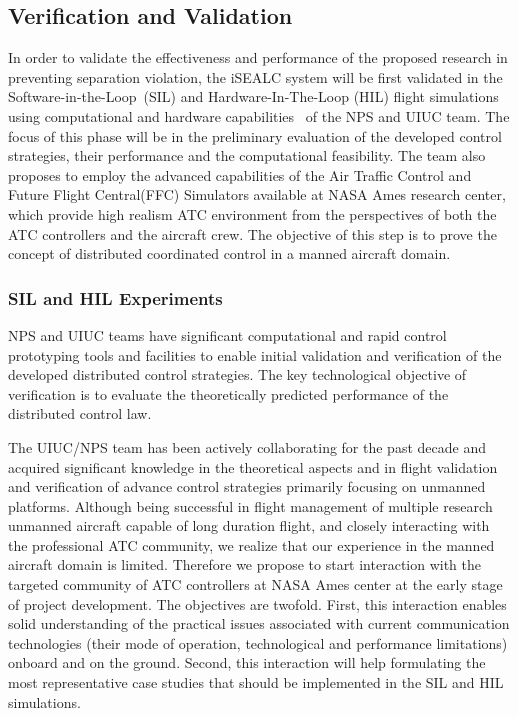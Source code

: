 \documentclass[letter,onecolumn,12pt]{aiaa-tc}
\newcommand{\1}{1_n}
\begin{document}
\subsection{Verification and Validation}

In order to validate the effectiveness and performance of the proposed research in preventing separation violation, the iSEALC system will be first validated in the Software-in-the-Loop~(SIL) and Hardware-In-The-Loop (HIL) flight simulations using computational and hardware capabilities~\cite{dobrokhodov2013RFCPS} of the NPS and UIUC team. The focus of this phase will be in the preliminary evaluation of the developed control strategies, their performance and the computational feasibility. The team also proposes to employ the advanced capabilities of the Air Traffic Control  and Future Flight Central(FFC) Simulators available at NASA Ames research center\cite{prevot2003distributed}, which provide high realism ATC environment from the perspectives of both the ATC controllers and the aircraft crew. The objective of this step is to prove the concept of distributed coordinated  control in a manned aircraft domain.

\subsubsection{SIL and HIL Experiments}
NPS and UIUC teams have significant computational and rapid control prototyping tools and facilities to enable initial validation and verification of the developed distributed control strategies. The key technological objective of verification is to evaluate the theoretically predicted performance of the distributed control law.

The UIUC/NPS team has been actively collaborating for the past decade and acquired significant knowledge in the theoretical aspects and in flight validation and verification of advance control strategies primarily focusing on unmanned platforms. Although being successful in flight management of multiple research unmanned aircraft capable of long duration flight, and closely interacting with the professional ATC community, we realize that our experience in the manned aircraft domain is limited. Therefore we propose to start interaction with the targeted community of ATC controllers at NASA Ames center at the early stage of project development. The objectives are twofold. First, this interaction enables solid understanding of the practical issues associated with current communication technologies (their mode of operation, technological and performance limitations) onboard and on the ground. Second, this interaction will help formulating the most representative case studies that should be implemented in the SIL and HIL simulations.
\end{document}
